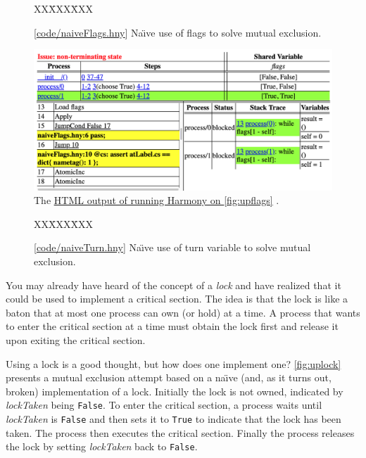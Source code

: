 \documentclass{report}
\newcommand{\harmonysource}[1]{
\begin{tabbing}
XX\=XXX\=XXX\kill
    
\end{tabbing}
}
\newcommand{\harmonylink}[1]{%
[\href{https://www.cs.cornell.edu/home/rvr/harmony/#1}{\underline{#1}}]%
}
\newcommand{\harmonyref}[2]{%
\href{https://www.cs.cornell.edu/home/rvr/harmony/output/#1}{\underline{#2}}%
}
\newenvironment{code}{
\tcolorbox
}{
\endtcolorbox
}
\begin{document}
\begin{figure}
\begin{code}
\harmonysource{naiveFlags}
\end{code}
\caption{\harmonylink{code/naiveFlags.hny} Na\"{\i}ve use of flags to solve mutual exclusion.}
\label{fig:upflags}
\end{figure}

\begin{figure}
\includegraphics[width=\textwidth]{figures/naiveFlags.png}
\caption{The \harmonyref{naiveFlags.html}{HTML output of running Harmony on \autoref{fig:upflags}}.}
\label{fig:naiveflagshtml}
\end{figure}

\begin{figure}
\begin{code}
\harmonysource{naiveTurn}
\end{code}
\caption{\harmonylink{code/naiveTurn.hny} Na\"{\i}ve use of turn variable to solve mutual exclusion.}
\label{fig:upturn}
\end{figure}

%

You may already have heard of the concept of a \emph{lock}
%
and have realized that
it could be used to implement a critical section.
The idea is that the lock is like a baton that at most one process can own
(or hold) at a time.
A process that wants to enter the critical section at a time must obtain the
lock first and release it upon exiting the critical section.

Using a lock is a good thought, but how does one implement one?
\autoref{fig:uplock} presents a mutual exclusion attempt based on a
na\"{\i}ve (and, as it turns out, broken) implementation of a lock.
Initially the lock is not owned, indicated by \textit{lockTaken} being \texttt{False}.
To enter the critical section, a process waits until \textit{lockTaken} is \texttt{False}
and then sets it to \texttt{True} to indicate that the lock has been taken.
The process then executes the critical section.  Finally the process
releases the lock by setting \textit{lockTaken} back to \texttt{False}.
\end{document}
